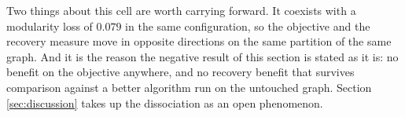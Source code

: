 Two things about this cell are worth carrying forward. It coexists with a
modularity loss of $0.079$ in the same configuration, so the objective and the
recovery measure move in opposite directions on the same partition of the same
graph. And it is the reason the negative result of this section is stated as it
is: no benefit on the objective anywhere, and no recovery benefit that survives
comparison against a better algorithm run on the untouched graph. Section
\ref{sec:discussion} takes up the dissociation as an open phenomenon.

